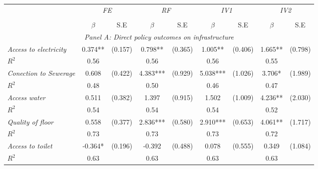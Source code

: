 \begin{tabular}{lcccccccc}


\hline
\hline


\multicolumn{1}{l}{} & \multicolumn{2}{c}{\textit{FE}} & \multicolumn{2}{c}{\textit{RF}} & \multicolumn{2}{c}{\textit{IV1}} & \multicolumn{2}{c}{\textit{IV2}}  \\ 
 
\cmidrule(l{1mm}r{1mm}){2-3} \cmidrule(l{1mm}r{1mm}){4-5} \cmidrule(l{1mm}r{1mm}){6-7}  \cmidrule(l{1mm}r{1mm}){8-9}  \\
& $\beta$ & S.E & $\beta$ & S.E & $\beta$ & S.E & $\beta$ & S.E \\
\hline

\multicolumn{9}{c}{\textit{Panel   A: Direct policy outcomes on infrastructure}}   \\                                                          

\textit{Access to electricity}          		  &  0.374**    & (0.157)      &   0.798**        &  (0.365)      &     1.005**  &    (0.406) &     1.665**  &    (0.798)   \\
$R^{2}$			           	   		  &  0.56   & 	   &     0.56   	&		 &     0.56   & &     0.55   &  \\
									  
\textit{Conection to Sewerage}          		  &  0.608    & (0.422)      &   4.383***        &  (0.929)      &     5.038***  &    (1.026)  &     3.706*  &    (1.989) \\
$R^{2}$			           	   		  &  0.48   & 	   &     0.50   	&		 &     0.46   & &     0.47   &  \\
									  
\textit{Access water}          		  &  0.511    & (0.382)      &   1.397        &  (0.915)      &     1.502  &    (1.009)  &     4.236**  &    (2.030) \\
$R^{2}$			           	   		  &  0.54   & 	   &     0.54   	&		 &     0.54   & &     0.52   &  \\
									  
\textit{Quality of floor}          		  &  0.558    & (0.377)      &   2.836***        &  (0.580)      &     2.910***  &    (0.653)  &     4.061**  &    (1.717) \\
$R^{2}$			           	   		  &  0.73   & 	   &     0.73   	&		 &     0.73   & &     0.72   &  \\
									  
\textit{Access to toilet}          		  &  -0.364*    & (0.196)      &   -0.392        &  (0.488)      &     0.078  &    (0.555) &     0.349  &    (1.084)  \\
$R^{2}$			           	   		  &  0.63   & 	   &     0.63   	&		 &     0.63   &   &     0.63   &  \\



\end{tabular}
